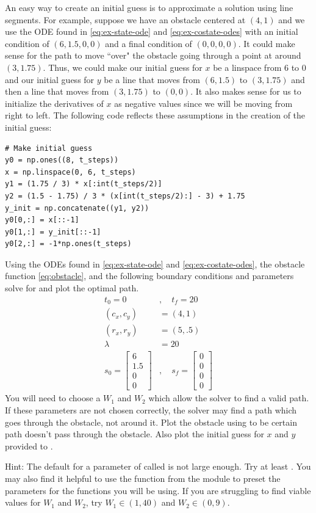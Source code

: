 An easy way to create an initial guess is to approximate a solution using line segments.
For example, suppose we have an obstacle centered at $(4,1)$ and we use the ODE found in \ref{eq:ex-state-ode} and \ref{eq:ex-costate-odes} with an initial condition of $(6, 1.5, 0, 0)$ and a final condition of $(0,0,0, 0)$.
It could make sense for the path to move ``over" the obstacle going through a point at around $(3, 1.75)$.
Thus, we could make our initial guess for $x$ be a linspace from 6 to 0 and our initial guess for $y$ be a line that moves from $(6,1.5)$ to $(3, 1.75)$ and then a line that moves from $(3, 1.75)$ to $(0,0)$.
It also makes sense for us to initialize the derivatives of $x$ as negative values since we will be moving from right to left.
The following code reflects these assumptions in the creation of the initial guess:

\begin{lstlisting}
# Make initial guess
y0 = np.ones((8, t_steps))
x = np.linspace(0, 6, t_steps)
y1 = (1.75 / 3) * x[:int(t_steps/2)]
y2 = (1.5 - 1.75) / 3 * (x[int(t_steps/2):] - 3) + 1.75
y_init = np.concatenate((y1, y2))
y0[0,:] = x[::-1]
y0[1,:] = y_init[::-1]
y0[2,:] = -1*np.ones(t_steps)
\end{lstlisting}


\begin{problem}
\label{prob:obstacle:bvp2}
Using the ODEs found in \ref{eq:ex-state-ode} and \ref{eq:ex-costate-odes}, the obstacle function \ref{eq:obstacle}, and the following boundary conditions and parameters solve for and plot the optimal path.
\begin{align*}
    t_0 = 0 &, \quad t_f = 20\\
    (c_x,c_y) &= (4,1)\\
    (r_x,r_y) &= (5,.5)\\
    \lambda &= 20\\
    s_0 = \begin{bmatrix}6\\1.5\\0\\0 \end{bmatrix}&, \quad s_f = \begin{bmatrix}0\\0\\0\\0 \end{bmatrix}
\end{align*}
You will need to choose a $W_1$ and $W_2$ which allow the solver to find a valid path.
If these parameters are not chosen correctly, the solver may find a path which goes through the obstacle, not around it.
Plot the obstacle using  to be certain path doesn't pass through the obstacle. Also plot the initial guess for $x$ and $y$ provided to .

Hint: The default for a parameter of  called  is not large enough.
Try at least .
You may also find it helpful to use the function  from the module  to preset the parameters for the functions you will be using.
If you are struggling to find viable values for $W_1$ and $W_2$, try $W_1\in (1,40)$ and $W_2\in (0,9)$.
\end{problem}

